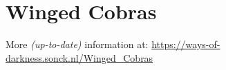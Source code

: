 \section{Winged Cobras}
More \textit{(up-to-date)} information at: \url{https://ways-of-darkness.sonck.nl/Winged_Cobras}


